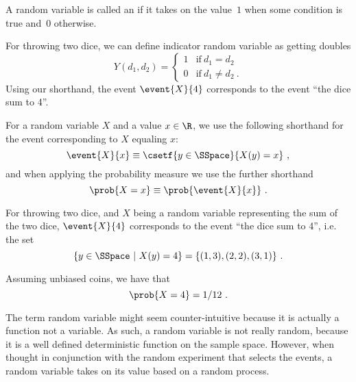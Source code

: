 \begin{flex}
\label{grp:grm:probability::randvar::indicator}

\begin{gram}
\label{grm:probability::randvar::indicator}
\begin{definition}
A random variable is called an  if it
takes on the value~$1$ when some condition is true and~$0$
otherwise.
\end{definition}
\begin{example}
  For throwing two dice, we can define indicator random variable
  as getting doubles
\[
Y(d_1,d_2) =
\left\{
\begin{array}{ll}
1 & \mbox{if}~d_1 = d_2
\\
0 & \mbox{if}~d_1 \not= d_2 ~.
\end{array}
\right.
\]
Using our shorthand, the event $\event{X}{4}$ corresponds
to the event ``the dice sum to 4''.
\end{example}

\end{gram}
\end{flex}

\begin{flex}
\label{grp:grm:probability::randvar::notation}

\begin{gram}[Notation]
\label{grm:probability::randvar::notation}
For a random variable $X$ and a value $x \in \R$, we use the following
shorthand for the event corresponding to $X$ equaling $x$:
\[\event{X}{x} \equiv \csetf{y \in \SSpace}{X(y)  = x}~,\]
and when applying the probability measure we use the further
shorthand
\[\prob{X = x} \equiv \prob{\event{X}{x}}~.\]

\end{gram}

\begin{example}
\label{xmpl:probability::randvar::dice}
  For throwing two dice, and $X$ being a random variable representing
  the sum of the two dice, $\event{X}{4}$ corresponds to the
  event ``the dice sum to 4'', i.e. the set
  \[\{y \in \SSpace~|~X(y) = 4\} = \{(1,3),(2,2),(3,1)\}~.\]

  Assuming unbiased coins, we have that
  \[\prob{X = 4} = 1/12~.\]

\end{example}
\end{flex}

\begin{cluster}
\label{grp:rmrk:probability::randvar::term}

\begin{remark}
\label{rmrk:probability::randvar::term}
The term random variable might seem counter-intuitive
because it is actually a function not a variable.
As such, a random variable is not really random, because it is a well
defined deterministic function on the sample space.  
However, when thought in conjunction with the random experiment that
selects the events, a random variable takes on its value based on a
random process.

\end{remark}
\end{cluster}


